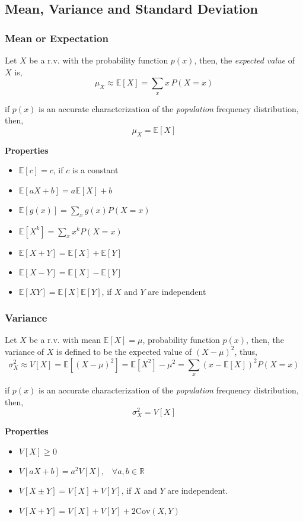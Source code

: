 \subsection{Mean, Variance and Standard Deviation}
\subsubsection{Mean or Expectation}
Let $X$ be a r.v. with the probability function $p(x)$, then, the
\textit{expected value} of $X$ is,
\[ \mu_{X} \approx \mathbb{E}[X] = \sum_{x} x\,P(X=x) \]

if $p(x)$ is an accurate characterization of the \textit{population} frequency
distribution, then,
\[ \mu_{X} = \mathbb{E}[X] \]

\textbf{Properties}
\begin{itemize}
    \item $\mathbb{E}[c] = c$, if $c$ is a constant
    \item $\mathbb{E}[aX+b]=a\mathbb{E}[X]+b$
    \item $\mathbb{E}[g(x)]=\sum_{x}g(x)P(X=x)$
    \item $\mathbb{E}[X^k] = \sum_{x} x^k P(X=x)$
    \item $\mathbb{E}[X+Y] = \mathbb{E}[X] + \mathbb{E}[Y]$
    \item $\mathbb{E}[X-Y] = \mathbb{E}[X] - \mathbb{E}[Y]$
    \item $\mathbb{E}[XY] = \mathbb{E}[X]\mathbb{E}[Y]$, if $X$ and $Y$ are
    independent
\end{itemize}

\subsubsection{Variance}
Let $X$ be a r.v. with mean $\mathbb{E}[X] = \mu$, probability function $p(x)$,
then, the variance of $X$ is defined to be the expected value of $(X-\mu)^2$,
thus,
\[ \sigma^2_X \approx V[X] = \mathbb{E}[(X-\mu)^2] = \mathbb{E}[X^2] - \mu^2 =
\sum_{x}(x-\mathbb{E}[X])^2 P(X=x) \]

if $p(x)$ is an accurate characterization of the \textit{population} frequency
distribution, then,
\[ \sigma^2_{X} =  V[X] \]

\textbf{Properties}
\begin{itemize}
    \item $V[X] \geq 0$
    \item $V[aX + b] = a^2V[X], \;\;\; \forall a,b \in \mathbb{R}$
    \item $V[X \pm Y] = V[X] + V[Y]$, if $X$ and $Y$ are independent.
    \item $V[X + Y] = V[X] + V[Y] + 2\text{Cov}(X,Y)$
\end{itemize}

